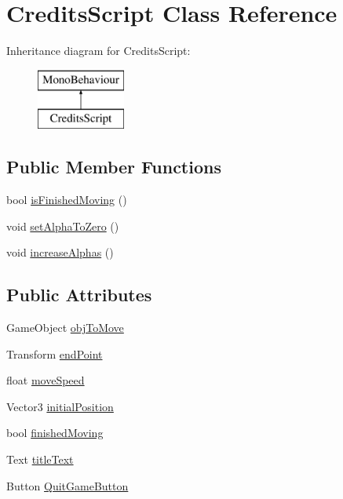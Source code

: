 \hypertarget{class_credits_script}{}\section{Credits\+Script Class Reference}
\label{class_credits_script}
Inheritance diagram for Credits\+Script\+:\begin{figure}[H]
\begin{center}
\leavevmode
\includegraphics[height=2.000000cm]{class_credits_script}
\end{center}
\end{figure}
\subsection*{Public Member Functions}
\begin{DoxyCompactItemize}
\item 
bool \hyperlink{class_credits_script_ae63ab5451f32c82bda6068facad2a213}{is\+Finished\+Moving} ()
\item 
void \hyperlink{class_credits_script_a6a5a4968b3661e7f2ff3b609c3584957}{set\+Alpha\+To\+Zero} ()
\item 
void \hyperlink{class_credits_script_ad37dc622426ba8d4a4b6a454d4ba81dd}{increase\+Alphas} ()
\end{DoxyCompactItemize}
\subsection*{Public Attributes}
\begin{DoxyCompactItemize}
\item 
Game\+Object \hyperlink{class_credits_script_aab6af5235394c7bc904ad65785bc8f31}{obj\+To\+Move}
\item 
Transform \hyperlink{class_credits_script_a1a7ba480a06d7f8bccdb07212e23c6c5}{end\+Point}
\item 
float \hyperlink{class_credits_script_aa10906c5f2d0a86707ec6755d953ea06}{move\+Speed}
\item 
Vector3 \hyperlink{class_credits_script_a592b962a0ac97ed95c8630dad261efe6}{initial\+Position}
\item 
bool \hyperlink{class_credits_script_a830a192ce2ae40b6b57e2e5e84f1bdbf}{finished\+Moving}
\item 
Text \hyperlink{class_credits_script_a82dd5ac0339aa56110dd0e0950a0c4c5}{title\+Text}
\item 
Button \hyperlink{class_credits_script_abe48b2113f4170b2ecd121d3476617e7}{Quit\+Game\+Button}
\end{DoxyCompactItemize}



